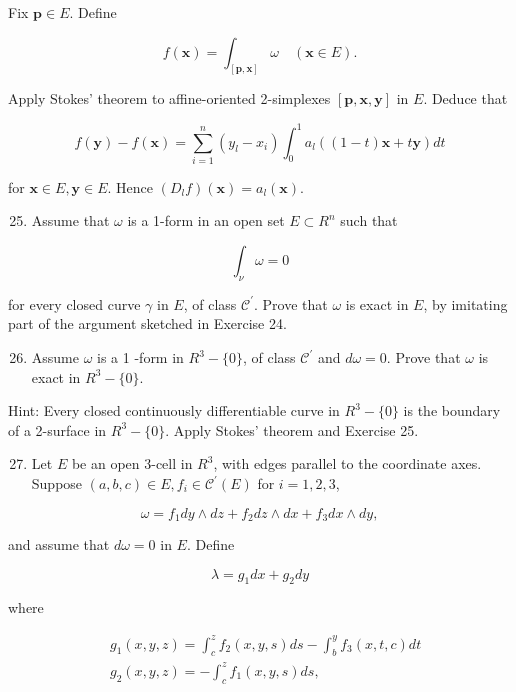\documentclass[10pt]{article}
\begin{document}
Fix $\mathbf{p} \in E$. Define

$$
f(\mathbf{x})=\int_{[\mathbf{p}, \mathbf{x}]} \omega \quad(\mathbf{x} \in E) .
$$

Apply Stokes' theorem to affine-oriented 2-simplexes $[\mathbf{p}, \mathbf{x}, \mathbf{y}]$ in $E$. Deduce that

$$
f(\mathbf{y})-f(\mathbf{x})=\sum_{i=1}^{n}\left(y_{l}-x_{i}\right) \int_{0}^{1} a_{l}((1-t) \mathbf{x}+t \mathbf{y}) d t
$$

for $\mathbf{x} \in E, \mathbf{y} \in E$. Hence $\left(D_{l} f\right)(\mathbf{x})=a_{l}(\mathbf{x})$.

\begin{enumerate}
  \setcounter{enumi}{24}
  \item Assume that $\omega$ is a 1-form in an open set $E \subset R^{n}$ such that
\end{enumerate}

$$
\int_{\nu} \omega=0
$$

for every closed curve $\gamma$ in $E$, of class $\mathscr{C}^{\prime}$. Prove that $\omega$ is exact in $E$, by imitating part of the argument sketched in Exercise 24.

\begin{enumerate}
  \setcounter{enumi}{25}
  \item Assume $\omega$ is a 1 -form in $R^{3}-\{0\}$, of class $\mathscr{C}^{\prime}$ and $d \omega=0$. Prove that $\omega$ is exact in $R^{3}-\{0\}$.
\end{enumerate}

Hint: Every closed continuously differentiable curve in $R^{3}-\{0\}$ is the boundary of a 2-surface in $R^{3}-\{0\}$. Apply Stokes' theorem and Exercise 25.

\begin{enumerate}
  \setcounter{enumi}{26}
  \item Let $E$ be an open 3-cell in $R^{3}$, with edges parallel to the coordinate axes. Suppose $(a, b, c) \in E, f_{i} \in \mathscr{C}^{\prime}(E)$ for $i=1,2,3$,
\end{enumerate}

$$
\omega=f_{1} d y \wedge d z+f_{2} d z \wedge d x+f_{3} d x \wedge d y,
$$

and assume that $d \omega=0$ in $E$. Define

$$
\lambda=g_{1} d x+g_{2} d y
$$

where

$$
\begin{aligned}
& g_{1}(x, y, z)=\int_{c}^{z} f_{2}(x, y, s) d s-\int_{b}^{y} f_{3}(x, t, c) d t \\
& g_{2}(x, y, z)=-\int_{c}^{z} f_{1}(x, y, s) d s,
\end{aligned}
$$
\end{document}
